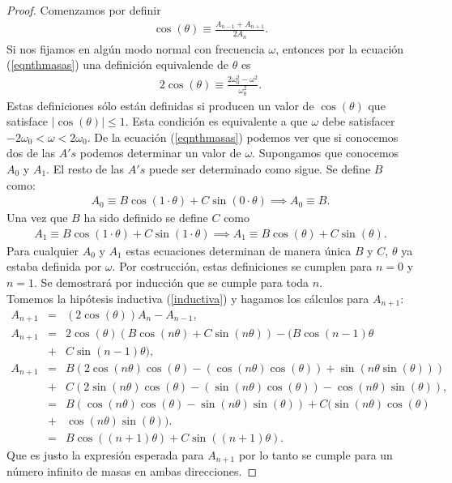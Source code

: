 \documentclass[letterpaper,12pt,oneside]{book}
\newcommand{\abs}[1]{\left\lvert#1\right\rvert}
\begin{document}
\begin{proof}
Comenzamos por definir
%
\begin{eqnarray}
\cos(\theta) \equiv \frac{A_{n-1}+A_{n+1}}{2A_n}.\label{costheta}
\end{eqnarray}
%
Si nos fijamos en alg\'un modo normal con frecuencia $\omega$, entonces por la ecuaci\'on (\ref{eqnthmasas}) una definici\'on equivalende de $\theta$ es 
%
\begin{eqnarray}
2\cos(\theta) \equiv \frac{2\omega_0^2-\omega^2}{\omega_0^2}.\label{2costheta}
\end{eqnarray}
%
Estas definiciones s\'olo est\'an definidas si producen un valor de $\cos(\theta)$ que satisface $\abs{\cos(\theta)}\leq 1$. Esta condici\'on es equivalente a que $\omega$ debe satisfacer $-2\omega_0 < \omega < 2\omega_0$. De la ecuaci\'on (\ref{eqnthmasas}) podemos ver que si conocemos dos de las $A's$ podemos determinar un valor de $\omega$. Supongamos que conocemos $A_0$ y $A_1$. El resto de las $A's$ puede ser determinado como sigue. Se define $B$ como:  
%
\begin{eqnarray}
A_0 \equiv B\cos(1\cdot \theta) + C\sin (0 \cdot \theta) \implies A_0\equiv B.
\end{eqnarray}
%
Una vez que $B$ ha sido definido se define $C$ como
%
\begin{eqnarray}
A_1 \equiv B\cos(1\cdot \theta) + C \sin(1\cdot\theta) \implies A_1\equiv B \cos(\theta)+C\sin(\theta).
\end{eqnarray}
%
Para cualquier $A_0$ y $A_1$ estas ecuaciones determinan de manera \'unica $B$ y $C$, $\theta$ ya estaba definida por $\omega$. Por costrucci\'on, estas definiciones se cumplen para $n=0$ y $n=1$. Se demostrar\'a por inducci\'on que se cumple para toda $n$.\\
Tomemos la hip\'otesis inductiva (\ref{inductiva}) y hagamos los c\'alculos para $A_{n+1}$:
%
\begin{eqnarray}
A_{n+1}&=&(2\cos(\theta))A_n-A_{n-1},\\
A_{n+1}&=&2\cos(\theta)(B\cos(n\theta)+C\sin(n\theta))-(B\cos(n-1)\theta\\
&+&C\sin(n-1)\theta),\nonumber\\
A_{n+1}&=&B(2\cos (n\theta)\cos(\theta)-(\cos(n\theta)\cos(\theta))+\sin(n\theta\sin(\theta)))\\
&+&C(2\sin(n\theta)\cos(\theta)-(\sin(n\theta)\cos(\theta))-\cos(n\theta) \sin(\theta))\nonumber,\\
&=&B(\cos(n\theta)\cos(\theta) -\sin(n\theta)\sin(\theta))+C(\sin(n\theta)\cos(\theta)\nonumber\\
&+& \cos(n\theta)\sin(\theta)). \\
&=&B\cos ((n+1)\theta) + C\sin((n+1)\theta).
\end{eqnarray}
%
Que es justo la expresi\'on esperada para $A_{n+1}$ por lo tanto se cumple para un n\'umero infinito de masas en ambas direcciones.
\end{proof}
\end{document}
